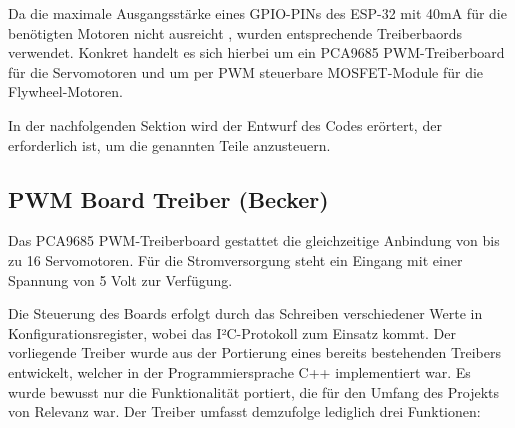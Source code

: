 Da die maximale Ausgangsstärke eines GPIO-PINs des ESP-32 mit 40mA \cite[S.~53]{esp_datasheet} für die benötigten Motoren nicht ausreicht \cite{esp_platform_flywheel_motor,esp_platform_small_servo,esp_platform_servo}, wurden entsprechende Treiberbaords verwendet.
Konkret handelt es sich hierbei um ein PCA9685 PWM-Treiberboard für die Servomotoren und um per PWM steuerbare MOSFET-Module für die Flywheel-Motoren.

In der nachfolgenden Sektion wird der Entwurf des Codes erörtert, der erforderlich ist, um die genannten Teile anzusteuern.

\subsection{PWM Board Treiber (Becker)}

Das PCA9685 PWM-Treiberboard gestattet die gleichzeitige Anbindung von bis zu 16 Servomotoren.
Für die Stromversorgung steht ein Eingang mit einer Spannung von 5 Volt zur Verfügung.

Die Steuerung des Boards erfolgt durch das Schreiben verschiedener Werte in Konfigurationsregister, wobei das I²C-Protokoll zum Einsatz kommt. 
Der vorliegende Treiber wurde aus der Portierung eines bereits bestehenden Treibers \cite{esp_pca9685_blueprint} entwickelt, welcher in der Programmiersprache C++ implementiert war. 
Es wurde bewusst nur die Funktionalität portiert, die für den Umfang des Projekts von Relevanz war. 
Der Treiber umfasst demzufolge lediglich drei Funktionen:

